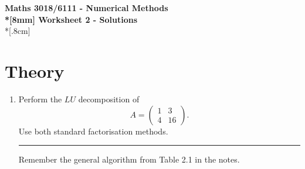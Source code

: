 \documentclass[10pt]{article}
\begin{document}
\thispagestyle{empty}
\begin{center}
\textbf{\Large Maths 3018/6111 - Numerical Methods \\*[8mm]
Worksheet 2 - Solutions}\\*[.8cm]
\end{center}

\section*{Theory}

\begin{enumerate}
\item Perform the $LU$ decomposition of
  \begin{equation*}
    A =
    \begin{pmatrix}
      1 & 3 \\ 4 & 16
    \end{pmatrix}.
  \end{equation*}
  Use both standard factorisation methods.
  \begin{center}
    \rule{0.9\textwidth}{.1pt}
  \end{center}
  Remember the general algorithm from Table 2.1 in the notes.


\end{enumerate}
\end{document}
